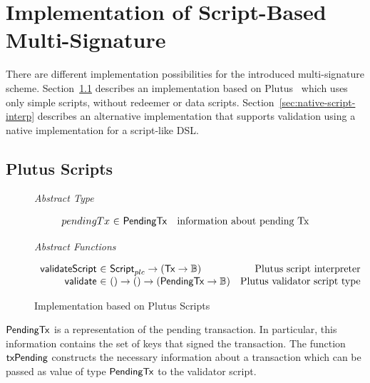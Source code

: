 \documentclass[11pt,a4paper,dvipsnames,twosided]{article}
\newcommand{\Bool}{\ensuremath{\mathbb{B}}}
\newcommand{\Tx}{\type{Tx}}
\newcommand{\Script}{\type{Script}}
\newcommand{\ScriptPlutus}{\Script_{plc}}
\newcommand{\PendingTx}{\type{PendingTx}}
\theoremstyle{definition}
\begin{document}
\section{Implementation of Script-Based Multi-Signature}
\label{sec:altern-impl}

There are different implementation possibilities for the introduced
multi-signature scheme. Section~\ref{sec:plutus-scripts} describes an
implementation based on Plutus~\cite{plutus_eutxo} which uses only simple
scripts, without redeemer or data
scripts. Section~\ref{sec:native-script-interp} describes an alternative
implementation that supports validation using a
native implementation for a script-like DSL.

\subsection{Plutus Scripts}
\label{sec:plutus-scripts}

\begin{figure}[hbt]
  \emph{Abstract Type}

  \begin{equation*}
    \begin{array}{r@{~\in~}lr}
      pendingTx & \PendingTx & \text{information about pending Tx}
    \end{array}
  \end{equation*}

  \emph{Abstract Functions}

  \begin{equation*}
    \begin{array}{r@{~\in~}lr}
      \fun{validateScript} & \ScriptPlutus \to (\Tx \to \Bool) & \text{Plutus script
                                                               interpreter} \\
      \fun{validate} & () \to () \to (\PendingTx \to \Bool) & \text{Plutus
                                                            validator script type}
    \end{array}
  \end{equation*}
  \caption{Implementation based on Plutus Scripts}
  \label{fig:types_defs_plutus}
\end{figure}

$\PendingTx$ is a representation of the pending transaction. In particular, this
information contains the set of keys that signed the transaction. The function
$\mathsf{txPending}$ constructs the necessary information about a transaction
which can be passed as value of type $\PendingTx$ to the validator script.
\end{document}
